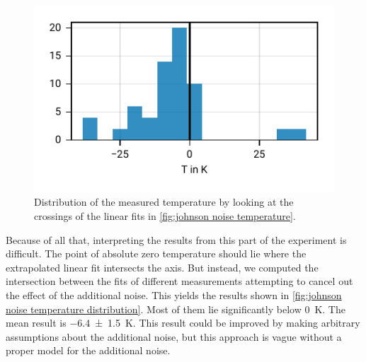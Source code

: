 \documentclass[
    parskip=half, 
    twoside=false,
    twocolumn=true,
    fontsize=11pt,
]{scrarticle}
\begin{document}
\begin{figure}[h!]
    \centering
    \includegraphics{figures/02 temperature distribution.pdf}
    \caption{
        Distribution of the measured temperature by looking at the crossings of the linear fits in \autoref{fig:johnson noise temperature}.
    }
    \label{fig:johnson noise temperature distribution}
\end{figure}
Because of all that, interpreting the results from this part of the experiment is difficult. 
The point of absolute zero temperature should lie where the extrapolated linear fit intersects the axis. But instead, we computed the intersection between the fits of different measurements attempting to cancel out the effect of the additional noise. This yields the results shown in \autoref{fig:johnson noise temperature distribution}. Most of them lie significantly below \SI{0}{\kelvin}. The mean result is \SI{-6.4(15)}{\kelvin}.
This result could be improved by making arbitrary assumptions about the additional noise, but this approach is vague without a proper model for the additional noise.
\end{document}

